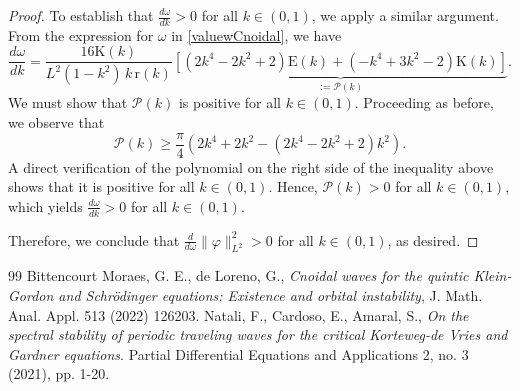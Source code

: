 \documentclass[10pt,a4paper]{amsart}
\begin{document}
\begin{proof}
    To establish that $\frac{d\omega}{dk}>0$ for all $k \in (0,1)$, we apply a similar argument. From the expression for $\omega$ in \eqref{valuewCnoidal}, we have
    \begin{equation*}
        \frac{d\omega}{dk} = \frac{16 \text{K}(k)}{L^2 (1-k^2) \, k \, \text{r}(k)} \underbrace{\left[ (2k^4 - 2k^2 + 2) \text{E}(k) + (- k^4 + 3k^2 - 2) \text{K}(k) \right]}_{:=\mathcal{P}(k)}.
    \end{equation*}
    We must show that $\mathcal{P}(k)$ is positive for all $k \in (0,1)$. Proceeding as before, we observe that
    \begin{equation*}
        \mathcal{P}(k) \geq \frac{\pi}{4} \left( 2k^4 + 2k^2 - (2k^4 - 2k^2 + 2)k^2 \right).
    \end{equation*}
{A direct verification of the polynomial on the right side of the inequality above shows that it is positive for all $k \in (0,1)$. Hence,  $\mathcal{P}(k) > 0$ for all $k \in (0,1)$, which yields $\frac{d\omega}{dk} > 0$ for all $k \in (0,1)$.  }    

    Therefore, we conclude that $\frac{d}{d\omega} \|\varphi\|_{L^2}^2 > 0$ for all $k \in (0,1)$, as desired.
\end{proof}

\begin{thebibliography}{99}
 Bittencourt Moraes, G. E., de Loreno, G., \textit{Cnoidal waves for the quintic Klein-Gordon and Schrödinger equations: Existence and orbital instability}, J. Math. Anal. Appl. 513 (2022) 126203. %
 Natali, F., Cardoso, E., Amaral, S., \textit{On the spectral stability of periodic traveling waves for the critical Korteweg-de Vries and Gardner equations}. Partial Differential Equations and Applications 2, no. 3 (2021), pp. 1-20.
\end{thebibliography}
\end{document}
